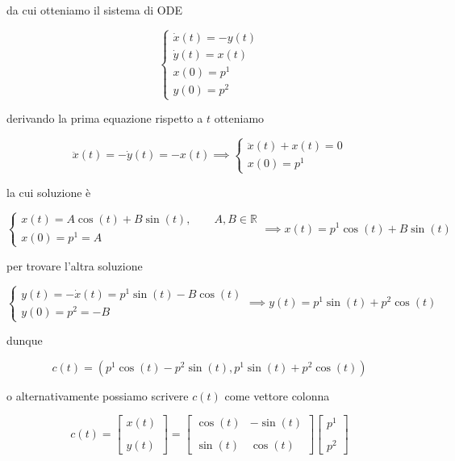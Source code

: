 da cui otteniamo il sistema di ODE

\begin{equation}
	\begin{cases}
		\dot{x}(t) = - y(t)\\
		\dot{y}(t) = x(t)\\
		x(0) = p^{1}\\
		y(0) = p^{2}
	\end{cases}
\end{equation}

derivando la prima equazione rispetto a $ t $ otteniamo

\begin{equation}
	\ddot{x}(t) = - \dot{y}(t) = - x(t) %
	\implies %
	\begin{cases}
		\ddot{x}(t) + x(t) = 0\\
		x(0) = p^{1}
	\end{cases}
\end{equation}

la cui soluzione è

\begin{equation}
	\begin{cases}
		x(t) = A \cos(t) + B \sin(t), \qquad A,B \in \mathbb{R}\\
		x(0) = p^{1} = A
	\end{cases}%
	\implies %
	x(t) = p^{1} \cos(t) + B \sin(t)
\end{equation}

per trovare l'altra soluzione

\begin{equation}
	\begin{cases}
		y(t) = - \dot{x}(t) = p^{1} \sin(t) - B \cos(t)\\
		y(0) = p^{2} = - B
	\end{cases}%
	\implies %
	y(t) = p^{1} \sin(t) + p^{2} \cos(t)
\end{equation}

dunque

\begin{equation}
	c(t) = (p^{1} \cos(t) - p^{2} \sin(t),p^{1} \sin(t) + p^{2} \cos(t))
\end{equation}

o alternativamente possiamo scrivere $ c(t) $ come vettore colonna

\begin{equation}
	c(t) = %
	\begin{bmatrix}
		x(t) \\\\ y(t)
	\end{bmatrix}%
	= %
	\begin{bmatrix}
		\cos(t) & - \sin(t) \\\\%
		\sin(t) & \cos(t)
	\end{bmatrix}%
	\begin{bmatrix}
		p^{1} \\\\ p^{2}
	\end{bmatrix}
\end{equation}

